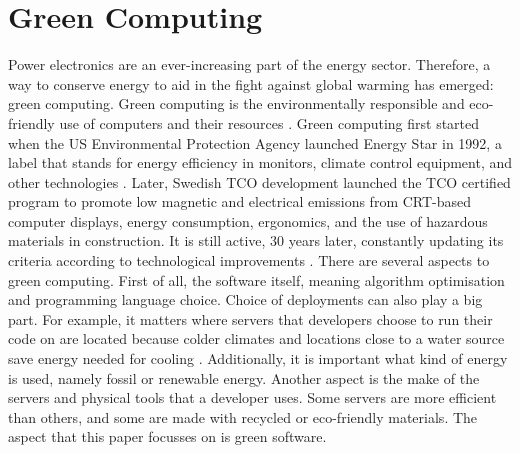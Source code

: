 \chapter{Green Computing}

Power electronics are an ever-increasing part of the energy sector. Therefore, a way to conserve energy to aid in the fight against global warming has emerged: green computing.
Green computing is the environmentally responsible and eco-friendly use of computers and their resources \cite{Salama20}. Green computing first started when the US Environmental Protection Agency launched Energy Star in 1992, a label that stands for energy efficiency in monitors, climate control equipment, and other technologies \cite{ENERGYSTAR}.
Later, Swedish TCO development launched the TCO certified program to promote low magnetic and electrical emissions from CRT-based computer displays, energy consumption, ergonomics, and the use of hazardous materials in construction. It is still active, 30 years later, constantly updating its criteria according to technological improvements \cite{TCOCertified}.
There are several aspects to green computing. First of all, the software itself, meaning algorithm optimisation and programming language choice. Choice of deployments can also play a big part. For example, it matters where servers that developers choose to run their code on are located because colder climates and locations close to a water source save energy needed for cooling \cite{cooling_datacenters}. Additionally, it is important what kind of energy is used, namely fossil or renewable energy. Another aspect is the make of the servers and physical tools that a developer uses. Some servers are more efficient than others, and some are made with recycled or eco-friendly materials.
The aspect that this paper focusses on is green software.


